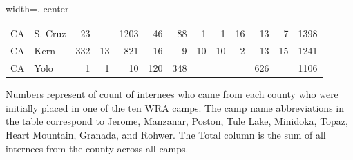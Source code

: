 \documentclass[12pt]{article}
\begin{document}
\begin{table}[ht]
\begin{adjustbox}{width=\textwidth, center}
\begin{tabular}{|ll|r|r|r|r|r|r|r|r|r|r|r|}
    CA & S. Cruz &  23 &  & 1203 &  46 &  88 &   1 &   1 &  16 &  13 &   7 & 1398 \\ 
    CA & Kern & 332 &  13 & 821 &  16 &   9 &  10 &  10 &   2 &  13 &  15 & 1241 \\ 
    CA & Yolo &   1 &   1 &  10 & 120 & 348 &  &  &  & 626 &  & 1106 \\ 
     \hline
  \end{tabular}
\end{adjustbox}
  \footnotesize
  Numbers represent of count of internees who came from each county who were initially placed in one of the ten WRA camps.
  The camp name abbreviations in the table correspond to Jerome, Manzanar, Poston, Tule Lake, Minidoka, Topaz, Heart Mountain, Granada, and Rohwer.
  The Total column is the sum of all internees from the county across all camps.
\end{table}
\end{document}
